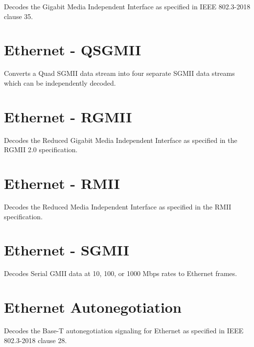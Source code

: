 Decodes the Gigabit Media Independent Interface as specified in IEEE 802.3-2018 clause 35.

\pagebreak
\section{Ethernet - QSGMII}

Converts a Quad SGMII data stream into four separate SGMII data streams which can be independently decoded.

\pagebreak
\section{Ethernet - RGMII}

Decodes the Reduced Gigabit Media Independent Interface as specified in the RGMII 2.0 specification.

\pagebreak
\section{Ethernet - RMII}

Decodes the Reduced Media Independent Interface as specified in the RMII specification.

\pagebreak
\section{Ethernet - SGMII}

Decodes Serial GMII data at 10, 100, or 1000 Mbps rates to Ethernet frames.

\pagebreak
\section{Ethernet Autonegotiation}

Decodes the Base-T autonegotiation signaling for Ethernet as specified in IEEE 802.3-2018 clause 28.

